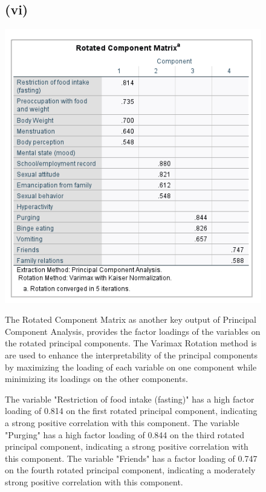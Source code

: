 \documentclass[english,10pt,a4paper]{article}
\begin{document}
\begin{figure}
\subsection*{(vi)}	
	\includegraphics[width=1\linewidth]{Rotated components matrix.png}
	
The Rotated Component Matrix as another key output of Principal Component Analysis, provides the factor loadings of the variables on the rotated principal components. The Varimax Rotation method is are used to enhance the interpretability of the principal components by maximizing the loading of each variable on one component while minimizing its loadings on the other components.	

The variable "Restriction of food intake (fasting)" has a high factor loading of 0.814 on the first rotated principal component, indicating a strong positive correlation with this component.
The variable "Purging" has a high factor loading of 0.844 on the third rotated principal component, indicating a strong positive correlation with this component.
The variable "Friends" has a factor loading of 0.747 on the fourth rotated principal component, indicating a moderately strong positive correlation with this component.
\end{figure}
\end{document}
